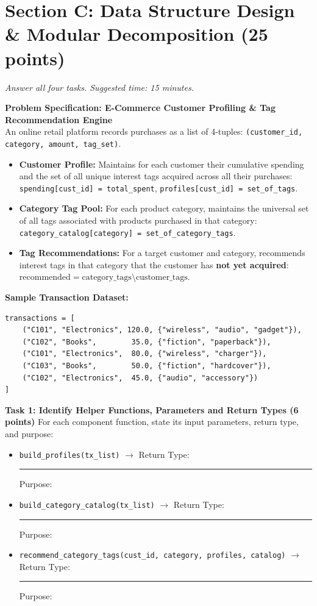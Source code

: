 \documentclass[11pt,a4paper]{article}
\begin{document}
\section*{Section C: Data Structure Design \& Modular Decomposition \hfill \normalsize\normalfont(25 points)}
\textit{Answer all four tasks. Suggested time: 15 minutes.}
\begin{tcolorbox}[colback=boxbg,colframe=secondaryteal,arc=1.5mm,boxrule=0.6pt,top=1.5mm,bottom=1.5mm]
\textbf{Problem Specification: E-Commerce Customer Profiling \& Tag Recommendation Engine}\\[0.5mm]
\small
An online retail platform records purchases as a list of 4-tuples: \texttt{(customer\_id, category, amount, tag\_set)}.
\begin{itemize}
\item \textbf{Customer Profile:} Maintains for each customer their cumulative spending and the set of all unique interest tags acquired across all their purchases: \texttt{spending[cust\_id] = total\_spent}, \texttt{profiles[cust\_id] = set\_of\_tags}.
\item \textbf{Category Tag Pool:} For each product category, maintains the universal set of all tags associated with products purchased in that category: \texttt{category\_catalog[category] = set\_of\_category\_tags}.
\item \textbf{Tag Recommendations:} For a target customer and category, recommends interest tags in that category that the customer has \textbf{not yet acquired}: $\text{recommended} = \text{category\_tags} \setminus \text{customer\_tags}$.
\end{itemize}
\textbf{Sample Transaction Dataset:}\\[-0.1em]
\begin{lstlisting}
transactions = [
    ("C101", "Electronics", 120.0, {"wireless", "audio", "gadget"}),
    ("C102", "Books",        35.0, {"fiction", "paperback"}),
    ("C101", "Electronics",  80.0, {"wireless", "charger"}),
    ("C103", "Books",        50.0, {"fiction", "hardcover"}),
    ("C102", "Electronics",  45.0, {"audio", "accessory"})
]
\end{lstlisting}
\end{tcolorbox}
\vspace{0.5mm}
\textbf{Task 1: Identify Helper Functions, Parameters and Return Types (6 points)}
For each component function, state its input parameters, return type, and purpose:
\begin{itemize}[leftmargin=1.8em,itemsep=2.5pt]
\item \texttt{build\_profiles(tx\_list)} $\rightarrow$ Return Type: \rule{3cm}{0.4pt} \quad Purpose: \dotfill
\item \texttt{build\_category\_catalog(tx\_list)} $\rightarrow$ Return Type: \rule{3cm}{0.4pt} \quad Purpose: \dotfill
\item \texttt{recommend\_category\_tags(cust\_id, category, profiles, catalog)} $\rightarrow$ Return Type: \rule{2.2cm}{0.4pt} \quad Purpose: \dotfill
\end{itemize}
\end{document}
